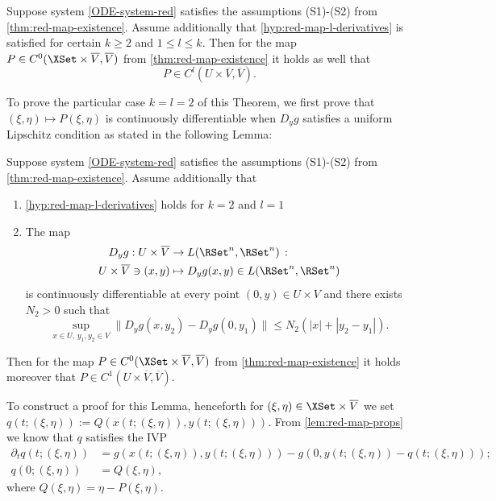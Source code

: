 \documentclass[a4paper]{siamart190516}
\begin{document}
 \begin{theorem}\label{thm:red-map-k-smoothness}
Suppose system \cref{ODE-system-red} satisfies the assumptions (S1)-(S2) from \cref{thm:red-map-existence}. 
Assume additionally that \cref{hyp:red-map-l-derivatives} is satisfied for certain $k \geq 2$ and $1 \leq l \leq k$.
Then for the map $P \in C^0(\XSet \times \overline{V}, \overline{V})$ from \cref{thm:red-map-existence} it holds as well that
\[
P \in C^{l}(U \times \overline{V}, \overline{V}).
\]
\end{theorem}


To prove the particular case $k=l=2$ of this Theorem, we first prove that 
$(\xi,\eta) \mapsto P(\xi,\eta)$ is continuously differentiable when $D_y g$ 
satisfies a uniform Lipschitz condition as stated in the following Lemma:
 
 \begin{lemma}\label{lem:red-map-C1}
Suppose system \cref{ODE-system-red} satisfies the assumptions (S1)-(S2) from \cref{thm:red-map-existence}. Assume additionally that
\begin{enumerate}
\item \cref{hyp:red-map-l-derivatives} holds for $k=2$ and $l=1$
\item The map
 \begin{align*}
 D_y g : U \times \overline{V} &\rightarrow L(\RSet^n,\RSet^n) \, : \\
U \times \overline{V} \ni (x,y) &\mapsto D_y g(x, y) \in L( \RSet^n,\RSet^n)
 \end{align*}
is continuously differentiable at every point $(0,y) \in U \times V$ and there exists $N_2 > 0$ such that
\[
\sup_{x \in U, \, y_1,y_2 \in V} \| D_y g(x,y_2) - D_y g(0,y_1)  \| \leq N_2 (|x| + |y_2 - y_1|).
\]
\end{enumerate}
 Then for the map $P \in C^0(\XSet \times \overline{V}, \overline{V})$ from \cref{thm:red-map-existence} it holds moreover that $P \in  C^1(U \times \overline{V}, \overline{V})$.
 \end{lemma}
 
To construct a proof for this Lemma, henceforth for $(\xi,\eta) \in \XSet \times
\overline{V}$ we set $q(t;(\xi,\eta)) := Q(x(t; (\xi,\eta)),y(t;(\xi,\eta)))$. From
\cref{lem:red-map-props} we know that $q$ satisfies the IVP
\begin{align*}
\partial_t q(t;(\xi,\eta)) &= g(x(t;(\xi,\eta)),y(t;(\xi,\eta))) - g(0,y(t;(\xi,\eta)) - q(t;(\xi,\eta))); \\
q(0;(\xi,\eta)) &= Q(\xi,\eta),
\end{align*}
where $Q(\xi, \eta) = \eta - P(\xi,\eta)$. 
\end{document}
